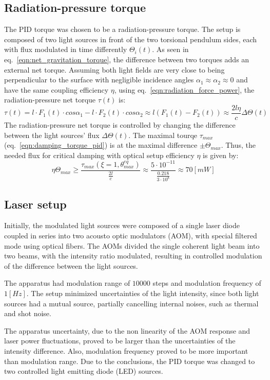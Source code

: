 \documentclass[\main/master.tex]{subfiles}
\begin{document}
\subsection{Radiation-pressure torque}
The PID torque was chosen to be a radiation-pressure torque. The setup is composed of two light sources in front of the two torsional pendulum sides, each with flux modulated in time differently $\Theta_i(t)$. As seen in eq.~\ref{eqn:net_gravitation_torque}, the difference between two torques adds an external net torque. Assuming both light fields are very close to being perpendicular to the surface with negligible incidence angles $\alpha_1\approx\alpha_2\approx 0$ and have the same coupling efficiency $\eta$, using eq.~\ref{eqn:radiation_force_power}, the radiation-pressure net torque $\tau(t)$ is:  
\begin{equation}
\tau(t) = l\cdot F_1(t) \cdot cos\alpha_1 - l\cdot F_2(t) \cdot cos\alpha_2\approx l(F_1(t) - F_2(t)) \approx \frac{2l\eta}{{c}} \Delta \Theta(t) \label{eqn:radiation torque}
\end{equation}
The radiation-pressure net torque is controlled by changing the difference between the light sources' flux $\Delta \Theta(t)$. The maximal tourqe $\tau_{max}$ (eq.~\ref{eqn:damping_torque_pid}) is at the maximal difference $\pm \Theta_{max}$. Thus, the needed flux for critical damping with optical setup efficiency $\eta$ is given by: 
\begin{equation}
\eta\Theta_{max} \geq \frac{\tau_{max}(\xi =1 ,\theta_{max}^{eq})}{\frac{2 l}{c}}\approx \frac{5\cdot10^{-11}}{\frac{ 0.218}{3\cdot10^{8}}}\approx 70 [mW]
\label{eqn:max radiation torque}
\end{equation}

\subsection{Laser setup}
Initially, the modulated light sources were composed of a single laser diode coupled in series into two acousto optic modulators (AOM), with special filtered mode using optical fibers. The AOMs divided the single coherent light beam into two beams, with the intensity ratio modulated, resulting in controlled modulation of the difference between the light sources.
\par\noindent
The apparatus had modulation range of $10000$ steps and modulation frequency of $1 [Hz]$. The setup minimized uncertainties of the light intensity, since both light sources had a mutual source, partially cancelling internal noises, such as thermal and shot noise. 
\par\noindent
The apparatus uncertainty, due to the non linearity of the AOM response and laser power fluctuations, proved to be larger than the uncertainties of the intensity difference. Also, modulation frequency proved to be more important than modulation range. Due to the conclusions, the PID torque was changed to two controlled light emitting diode (LED) sources.
\end{document}
